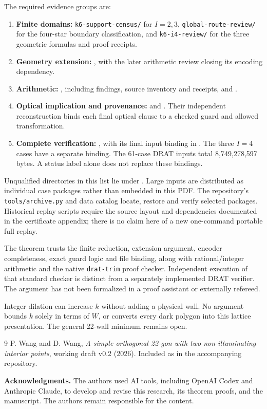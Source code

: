 \documentclass[11pt]{article}
\theoremstyle{definition}
\begin{document}
The required evidence groups are:
\begin{enumerate}
\item \textbf{Finite domains:} \texttt{k6-support-census/} for $I=2,3$, \texttt{global-route-review/} for the four-star boundary classification, and \texttt{k6-i4-review/} for the three geometric formulas and proof receipts.
\item \textbf{Geometry extension:} , with the later arithmetic review closing its encoding dependency.
\item \textbf{Arithmetic:} , including findings, source inventory and receipts, and .
\item \textbf{Optical implication and provenance:}  and . Their independent reconstruction binds each final optical clause to a checked guard and allowed transformation.
\item \textbf{Complete verification:} , with its final input binding in . The three $I=4$ cases have a separate binding. The 61-case DRAT inputs total 8,749,278,597 bytes. A status label alone does not replace these bindings.
\end{enumerate}
Unqualified directories in this list lie under . Large inputs are distributed as individual case packages rather than embedded in this PDF. The repository's \texttt{tools/archive.py} and data catalog locate, restore and verify selected packages. Historical replay scripts require the source layout and dependencies documented in the certificate appendix; there is no claim here of a new one-command portable full replay.

The theorem trusts the finite reduction, extension argument, encoder completeness, exact guard logic and file binding, along with rational/integer arithmetic and the native \texttt{drat-trim} proof checker. Independent execution of that standard checker is distinct from a separately implemented DRAT verifier. The argument has not been formalized in a proof assistant or externally refereed.

Integer dilation can increase $k$ without adding a physical wall. No argument bounds $k$ solely in terms of $W$, or converts every dark polygon into this lattice presentation. The general 22-wall minimum remains open.

\begin{thebibliography}{9}
 P. Wang and D. Wang, \emph{A simple orthogonal 22-gon with two non-illuminating interior points}, working draft v0.2 (2026). Included as  in the accompanying repository.
\end{thebibliography}

\smallskip\noindent\textbf{Acknowledgments.} The authors used AI tools, including OpenAI Codex and Anthropic Claude, to develop and revise this research, its theorem proofs, and the manuscript. The authors remain responsible for the content.
\end{document}
